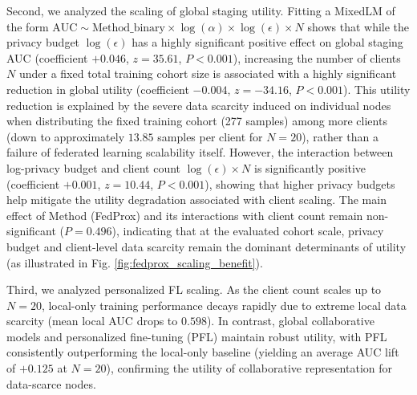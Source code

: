 \documentclass[conference]{IEEEtran}
\begin{document}
Second, we analyzed the scaling of global staging utility. Fitting a MixedLM of the form $\text{AUC} \sim \text{Method\_binary} \times \log(\alpha) \times \log(\epsilon) \times N$ shows that while the privacy budget $\log(\epsilon)$ has a highly significant positive effect on global staging AUC (coefficient $+0.046$, $z=35.61$, $P < 0.001$), increasing the number of clients $N$ under a fixed total training cohort size is associated with a highly significant reduction in global utility (coefficient $-0.004$, $z=-34.16$, $P < 0.001$). This utility reduction is explained by the severe data scarcity induced on individual nodes when distributing the fixed training cohort (277 samples) among more clients (down to approximately $13.85$ samples per client for $N=20$), rather than a failure of federated learning scalability itself. However, the interaction between log-privacy budget and client count $\log(\epsilon) \times N$ is significantly positive (coefficient $+0.001$, $z=10.44$, $P < 0.001$), showing that higher privacy budgets help mitigate the utility degradation associated with client scaling. The main effect of Method (FedProx) and its interactions with client count remain non-significant ($P=0.496$), indicating that at the evaluated cohort scale, privacy budget and client-level data scarcity remain the dominant determinants of utility (as illustrated in Fig. \ref{fig:fedprox_scaling_benefit}).

Third, we analyzed personalized FL scaling. As the client count scales up to $N=20$, local-only training performance decays rapidly due to extreme local data scarcity (mean local AUC drops to $0.598$). In contrast, global collaborative models and personalized fine-tuning (PFL) maintain robust utility, with PFL consistently outperforming the local-only baseline (yielding an average AUC lift of $+0.125$ at $N=20$), confirming the utility of collaborative representation for data-scarce nodes.
\end{document}
